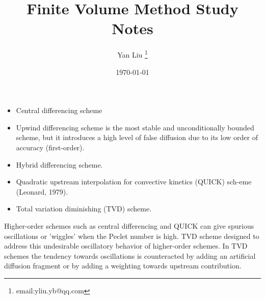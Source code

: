 \documentclass[12pt, letterpaper, twoside]{article}
\title{Finite Volume Method Study Notes}
\author{Yan Liu \thanks{email:yliu.yb@qq.com}}
\date{\today}
\begin{document}
\maketitle

\begin{itemize}
    \item Central differencing scheme
    \item Upwind differencing scheme is the most stable and unconditionally bounded scheme, 
but it introduces a high level of false diffusion due to its low order of accuracy (first-order).
    \item Hybrid differencing scheme.
    \item Quadratic upstream interpolation for convective kinetics (QUICK) sch-eme (Leonard, 1979).
    \item Total variation diminishing (TVD) scheme. 
\end{itemize}

Higher-order schemes such as central differencing and QUICK can give spurious oscillations 
or 'wiggles' when the Peclet number is high. TVD scheme designed to address this undesirable 
oscillatory behavior of higher-order schemes. In TVD schemes the tendency towards oscillations
is counteracted by adding an artificial diffusion fragment or by adding a weighting towards 
upstream contribution.
\end{document}
